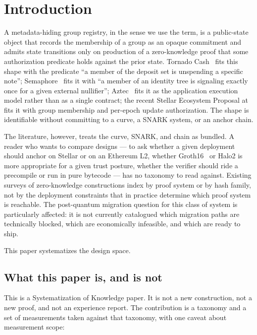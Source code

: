 \section{Introduction}
\label{sec:intro}

A metadata-hiding group registry, in the sense we use the term, is a
public-state object that records the membership of a group as an
opaque commitment and admits state transitions only on production of a
zero-knowledge proof that some authorization predicate holds against
the prior state. Tornado Cash~\cite{pertsev-2019-tornado} fits this
shape with the predicate ``a member of the deposit set is unspending a
specific note''; Semaphore~\cite{semaphore-2024} fits it with ``a
member of an identity tree is signaling exactly once for a given
external nullifier''; Aztec~\cite{aztec-2024} fits it as the
application execution model rather than as a single contract; the
recent Stellar Ecosystem Proposal at~\cite{sep-onym} fits it with
group membership and per-epoch update authorization. The shape is
identifiable without committing to a curve, a SNARK system, or an
anchor chain.

The literature, however, treats the curve, SNARK, and chain as
bundled. A reader who wants to compare designs --- to ask whether a
given deployment should anchor on Stellar or on an Ethereum L2,
whether Groth16~\cite{groth-2016-onpairing} or Halo2 is more
appropriate for a given trust posture, whether the verifier should
ride a precompile or run in pure bytecode --- has no taxonomy to read
against. Existing surveys of zero-knowledge constructions index by
proof system or by hash family, not by the deployment constraints that
in practice determine which proof system is reachable. The
post-quantum migration question for this class of system is
particularly affected: it is not currently catalogued which migration
paths are technically blocked, which are economically infeasible, and
which are ready to ship.

This paper systematizes the design space.

\subsection*{What this paper is, and is not}

This is a Systematization of Knowledge paper. It is not a new
construction, not a new proof, and not an experience report. The
contribution is a taxonomy and a set of measurements taken against
that taxonomy, with one caveat about measurement scope:

